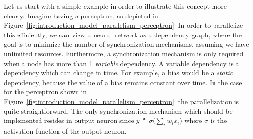 Let us start with a simple example in order to illustrate this concept more clearly. Imagine having a perceptron, as depicted in Figure~\ref{fig:introduction_model_parallelism_perceptron}. In order to parallelize this efficiently, we can view a neural network as a dependency graph, where the goal is to minimize the number of synchronization mechanisms, assuming we have unlimited resources. Furthermore, a synchronization mechanism is only required when a node has more than 1 \emph{variable} dependency. A variable dependency is a dependency which can change in time. For example, a bias would be a \emph{static} dependency, because the value of a bias remains constant over time. In the case for the perceptron shown in Figure~\ref{fig:introduction_model_parallelism_perceptron}, the parallelization is quite straightforward. The only synchronization mechanism which should be implemented resides in output neuron since $y \triangleq \sigma(\sum_i w_ix_i$) where $\sigma$ is the activation function of the output neuron.

